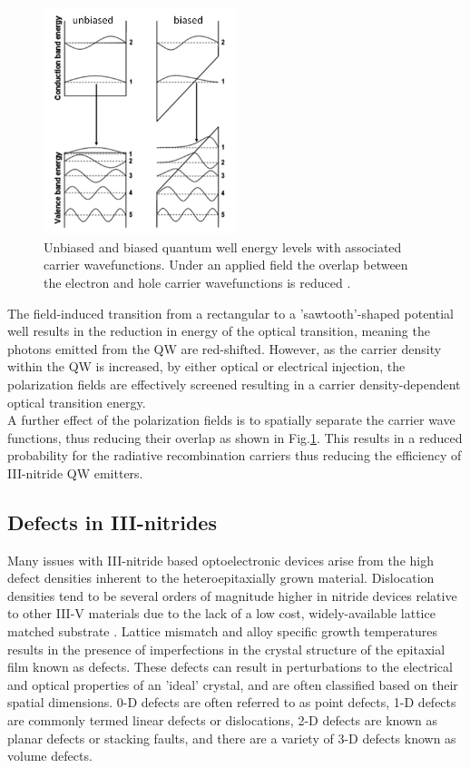 \begin{figure}[h]
	\centering
	\includegraphics[width=0.5\textwidth]{Figs/Ch1/QCSE.png}
	\caption {Unbiased and biased quantum well energy levels with associated carrier wavefunctions. Under an applied field the overlap between the electron and hole carrier wavefunctions is reduced \cite{Ryou2009}.}
	\label{1.5}
\end{figure}
\FloatBarrier 

The field-induced transition from a rectangular to a 'sawtooth'-shaped potential well results in the reduction in energy of the optical transition, meaning the photons emitted from the QW are red-shifted. However, as the carrier density within the QW is increased, by either optical or electrical injection, the polarization fields are effectively screened resulting in a carrier density-dependent optical transition energy.\\
A further effect of the polarization fields is to spatially separate the carrier wave functions, thus reducing their overlap as shown in Fig.\ref{1.5}. This results in a reduced probability for the radiative recombination carriers thus reducing the efficiency of III-nitride QW emitters.
\subsection{Defects in III-nitrides}  %
\label{section1.1.4}
Many issues with III-nitride based optoelectronic devices arise from the high defect densities inherent to the heteroepitaxially grown material. Dislocation densities tend to be several orders of magnitude higher in nitride devices relative to other III-V materials due to the lack of a low cost, widely-available lattice matched substrate \cite{Bennett2010b}. Lattice mismatch and alloy specific growth temperatures results in the presence of imperfections in the crystal structure of the epitaxial film known as defects. These defects can result in perturbations to the electrical and optical properties of an 'ideal' crystal, and are often classified based on their spatial dimensions. 0-D defects are often referred to as point defects, 1-D defects are commonly termed linear defects or dislocations, 2-D defects are known as planar defects or stacking faults, and there are a variety of 3-D defects known as volume defects.

